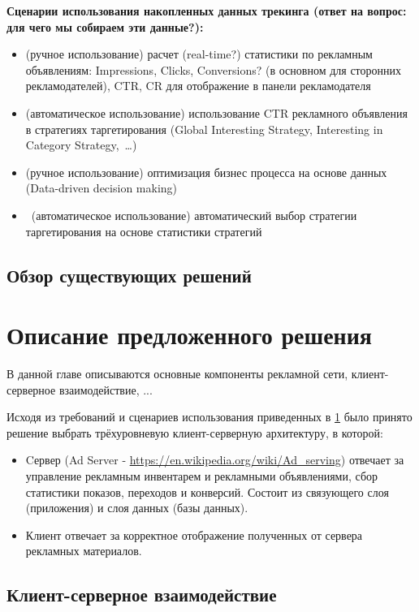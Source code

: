 \documentclass[times]{itmo-student-thesis}
\begin{document}
\textbf{Сценарии использования накопленных данных трекинга (ответ на вопрос: для чего мы собираем эти данные?):}
\begin{itemize}
	\item (ручное использование) расчет (real-time?) статистики по рекламным объявлениям: Impressions, Clicks, Conversions? (в основном для сторонних рекламодателей), CTR, CR для отображение в панели рекламодателя
	\item (автоматическое использование) использование CTR рекламного объявления в стратегиях таргетирования (Global Interesting Strategy, Interesting in Category Strategy, …)
	\item (ручное использование) оптимизация бизнес процесса на основе данных (Data-driven decision making)
	\item  (автоматическое использование) автоматический выбор стратегии таргетирования на основе статистики стратегий
\end{itemize}


\section{Обзор существующих решений}\label{sec:requirements}

\finishrelatedwork %


\chapterconclusion


\chapter{Описание предложенного решения}

В данной главе описываются основные компоненты рекламной сети, клиент-серверное взаимодействие, ...

Исходя из требований и сценариев использования приведенных в \ref{sec:requirements} было принято решение выбрать трёхуровневую клиент-серверную архитектуру, в которой:
\begin{itemize}
	\item Cервер (Ad Server - \url{https://en.wikipedia.org/wiki/Ad_serving}) отвечает за управление рекламным инвентарем и рекламными объявлениями, сбор статистики показов, переходов и конверсий. Состоит из связующего слоя (приложения) и слоя данных (базы данных).
	\item Клиент отвечает за корректное отображение полученных от сервера рекламных материалов.
\end{itemize}

\section{Клиент-серверное взаимодействие}
\end{document}
